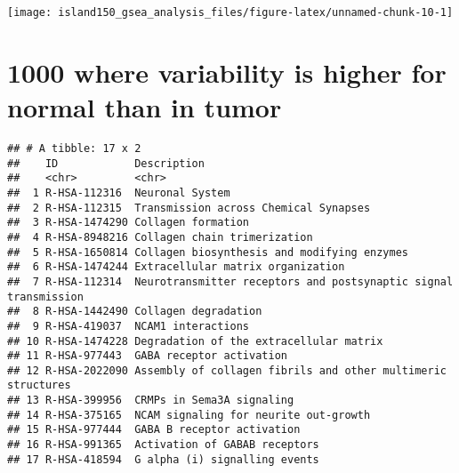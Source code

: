 \documentclass[
]{article}
\newenvironment{Shaded}{\begin{snugshade}}{\end{snugshade}}
\newcommand{\KeywordTok}[1]{\textcolor[rgb]{0.13,0.29,0.53}{\textbf{#1}}}
\newcommand{\NormalTok}[1]{#1}
\newcommand{\OperatorTok}[1]{\textcolor[rgb]{0.81,0.36,0.00}{\textbf{#1}}}
\newcommand{\StringTok}[1]{\textcolor[rgb]{0.31,0.60,0.02}{#1}}
\begin{document}
\texttt{[image: island150\_gsea\_analysis\_files/figure-latex/unnamed-chunk-10-1]}

\hypertarget{where-variability-is-higher-for-normal-than-in-tumor}{%
\section{1000 where variability is higher for normal than in
tumor}\label{where-variability-is-higher-for-normal-than-in-tumor}}

\begin{Shaded}
\end{Shaded}

\begin{verbatim}
## # A tibble: 17 x 2
##    ID            Description                                                    
##    <chr>         <chr>                                                          
##  1 R-HSA-112316  Neuronal System                                                
##  2 R-HSA-112315  Transmission across Chemical Synapses                          
##  3 R-HSA-1474290 Collagen formation                                             
##  4 R-HSA-8948216 Collagen chain trimerization                                   
##  5 R-HSA-1650814 Collagen biosynthesis and modifying enzymes                    
##  6 R-HSA-1474244 Extracellular matrix organization                              
##  7 R-HSA-112314  Neurotransmitter receptors and postsynaptic signal transmission
##  8 R-HSA-1442490 Collagen degradation                                           
##  9 R-HSA-419037  NCAM1 interactions                                             
## 10 R-HSA-1474228 Degradation of the extracellular matrix                        
## 11 R-HSA-977443  GABA receptor activation                                       
## 12 R-HSA-2022090 Assembly of collagen fibrils and other multimeric structures   
## 13 R-HSA-399956  CRMPs in Sema3A signaling                                      
## 14 R-HSA-375165  NCAM signaling for neurite out-growth                          
## 15 R-HSA-977444  GABA B receptor activation                                     
## 16 R-HSA-991365  Activation of GABAB receptors                                  
## 17 R-HSA-418594  G alpha (i) signalling events
\end{verbatim}
\end{document}

